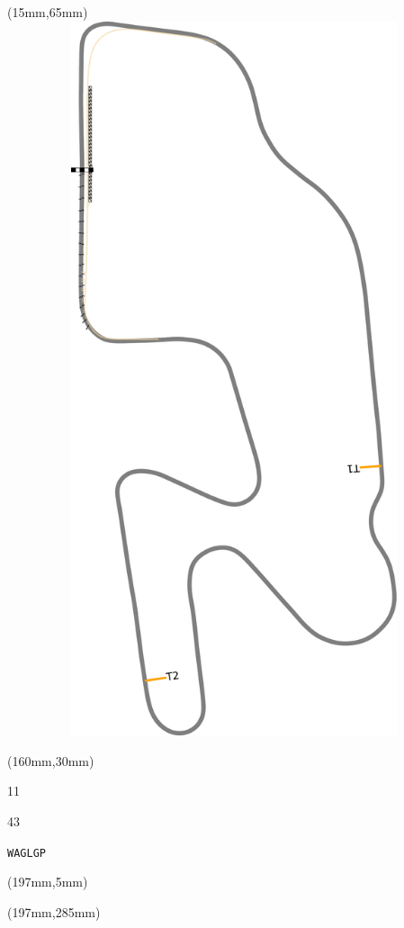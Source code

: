 \begin{textblock*}{185mm}(15mm,65mm)%
\centering
\mbox{\includegraphics[width=185mm,height=210mm,keepaspectratio]{PT/WAGLGP.pdf}}
\end{textblock*}
\begin{textblock*}{40mm}(160mm,30mm)%
\Large
\par{} 
\par11 
\par43 
\par\hfill\tiny\tt WAGLGP\\
\end{textblock*}
\begin{textblock*}{20mm}(197mm,5mm)%
\fbox{\thepage}
\label{WAGLGP}
\end{textblock*}
\begin{textblock*}{20mm}(197mm,285mm)%
\fbox{\thepage}
\end{textblock*}


